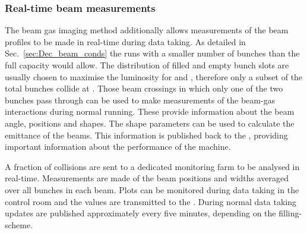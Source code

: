 \subsubsection{Real-time beam measurements}
\label{sec:Dec_real_time}
The beam gas imaging method additionally allows measurements of the beam profiles to be made in real-time during data taking. 
As detailed in Sec.~\ref{sec:Dec_beam_conds} the \lhc runs with a smaller number of bunches than the full capacity would allow. The distribution of filled and empty bunch slots are usually chosen to maximise the luminosity for \atlas and \cms, therefore only a subset of the total bunches collide at \lhcb. Those beam crossings in which only one of the two bunches pass through \lhcb can be used to make measurements of the beam-gas interactions during normal running.
These provide information about the beam angle, positions and shapes. The shape parameters can be used to calculate the emittance of the beams. This information is published back to the \lhc, providing important information about the performance of the machine.

A fraction of collisions are sent to a dedicated monitoring farm to be analysed in real-time. Measurements are made of the beam positions and widths averaged over all bunches in each beam. 
Plots can be monitored during data taking in the \lhcb control room and the values are transmitted to the \lhc. During normal data taking updates are published approximately every five minutes, depending on the \lhc filling-scheme. 


